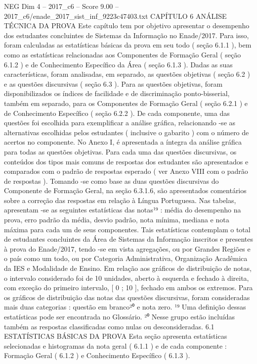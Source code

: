 \begin{textsample}{NEG Dim 4 – 2017\_c6 – Score 9.00 – 2017\_c6/enade\_2017\_sist\_inf\_9223c47403.txt}  \label{ex:f4_neg_321}
CAPÍTULO 6 ANÁLISE TÉCNICA DA PROVA Este capítulo tem por objetivo apresentar o desempenho dos estudantes concluintes de Sistemas da Informação no Enade/2017.
Para isso, foram calculadas as estatísticas básicas da prova em seu todo ( seção 6.1.1 ), bem como as estatísticas relacionadas aos Componentes de Formação Geral ( seção 6.1.2 ) e de Conhecimento Específico da Área ( seção 6.1.3 ).
Dadas as suas características, foram analisadas, em separado, as questões objetivas ( seção 6.2 ) e as questões discursivas ( seção 6.3 ).
Para as questões objetivas, foram disponibilizados os índices de facilidade e de discriminação ponto-bisserial, também em separado, para os Componentes de Formação Geral ( seção 6.2.1 ) e de Conhecimento Específico ( seção 6.2.2 ).
De cada componente, uma das questões foi escolhida para exemplificar a análise gráfica, relacionando -se as alternativas escolhidas pelos estudantes ( inclusive o gabarito ) com o número de acertos no componente.
No Anexo I, é apresentada a íntegra da análise gráfica para todas as questões objetivas.
Para cada uma das questões discursivas, os conteúdos dos tipos mais comuns de respostas dos estudantes são apresentados e comparados com o padrão de respostas esperado ( ver Anexo VIII com o padrão de respostas ).
Tomando -se como base as duas questões discursivas do Componente de Formação Geral, na seção 6.3.1.6, são apresentados comentários sobre a correção das respostas em relação à Língua Portuguesa.
Nas tabelas, apresentam -se as seguintes estatísticas das notas¹⁹ : média do desempenho na prova, erro padrão da média, desvio padrão, nota mínima, mediana e nota máxima para cada um de seus componentes.
Tais estatísticas contemplam o total de estudantes concluintes da Área de Sistemas da Informação inscritos e presentes à prova do Enade/2017, tendo -se em vista agregações, ou por Grandes Regiões e o país como um todo, ou por Categoria Administrativa, Organização Acadêmica da IES e Modalidade de Ensino.
Em relação aos gráficos de distribuição de notas, o intervalo considerado foi de 10 unidades, aberto à esquerda e fechado à direita, com exceção do primeiro intervalo, [ 0 ; 10 ], fechado em ambos os extremos.
Para os gráficos de distribuição das notas das questões discursivas, foram consideradas mais duas categorias : questão em branco²⁰ e nota zero. ¹⁹ Uma definição dessas estatísticas pode ser encontrada no Glossário. ²⁰ Nesse grupo estão incluídas também as respostas classificadas como nulas ou desconsideradas. 6.1 ESTATÍSTICAS BÁSICAS DA PROVA Esta seção apresenta estatísticas selecionadas e histogramas da nota geral ( 6.1.1 ) e de cada componente : Formação Geral ( 6.1.2 ) e Conhecimento Específico ( 6.1.3 ).

\end{textsample}
